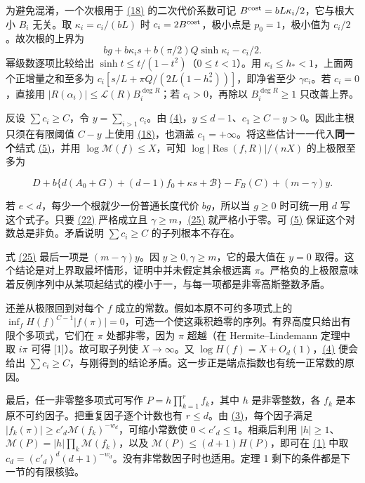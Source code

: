 \documentclass[11pt,a4paper]{article}
\begin{document}
为避免混淆，一个次根用于 \hyperref[eq:18]{(18)} 的二次代价系数可记 \(B^{\rm cost}=bL\kappa_i/2\)，它与根大小 \(B_i\) 无关。取 \(\kappa_i=c_i/(bL)\) 时 \(c_i=2B^{\rm cost}\)，极小点是 \(p_0=1\)，极小值为 \(c_i/2\)。故次根的上界为 \[
 bg+b\kappa_i s+b(\pi/2)Q\sinh\kappa_i-c_i/2 .
\] 幂级数逐项比较给出 \(\sinh t\le t/(1-t^2)\)（\(0\le t<1\)）。用 \(\kappa_i\le h_*<1\)，上面两个正增量之和至多为 \(c_i[s/L+\pi Q/(2L(1-h_*^2))]\)，即净省至少 \(\gamma c_i\)。若 \(c_i=0\)，直接用 \(|R(\alpha_i)|\le\mathcal L(R)B_i^{\deg R}\)；若 \(c_i>0\)，再除以 \(B_i^{\deg R}\ge1\) 只改善上界。

反设 \(\sum c_i\ge C\)，令 \(y=\sum_{i>1}c_i\)。由 \hyperref[eq:4]{(4)}，\(y\le d-1\)、\(c_1\ge C-y>0\)。因此主根只须在有限阈值 \(C-y\) 上使用 \hyperref[eq:18]{(18)}，也涵盖 \(c_1=+\infty\)。将这些估计一一代入\textbf{同一个}结式 \hyperref[eq:5]{(5)}，并用 \(\log\mathcal M(f)\le X\)，可知 \(\log|\operatorname{Res}(f,R)|/(nX)\) 的上极限至多为

\[
 D+b\{d(A_0+G)+(d-1)f_0+\kappa s+\mathcal B\}
       -F_B(C)+(m-\gamma)y .                                              \tag{25}\label{eq:25}
\]

若 \(e<d\)，每少一个根就少一份普通长度代价 \(bg\)，所以当 \(g\ge0\) 时可统一用 \(d\) 写这个式子。只要 \hyperref[eq:22]{(22)} 严格成立且 \(\gamma\ge m\)，\hyperref[eq:25]{(25)} 就严格小于零。可 \hyperref[eq:5]{(5)} 保证这个对数总是非负。矛盾说明 \(\sum c_i\ge C\) 的子列根本不存在。

式 \hyperref[eq:25]{(25)} 最后一项是 \((m-\gamma)y\)。因 \(y\ge0,\gamma\ge m\)，它的最大值在 \(y=0\) 取得。这个结论是对上界取最坏情形，证明中并未假定其余根远离 \(\pi\)。严格负的上极限意味着反例序列中从某项起结式的模小于一，与每一项都是非零高斯整数矛盾。

还差从极限回到对每个 \(f\) 成立的常数。假如本原不可约多项式上的 \(\inf_f H(f)^{C-1}|f(\pi)|=0\)，可选一个使这乘积趋零的序列。有界高度只给出有限个多项式，它们在 \(\pi\) 处都非零，因为 \(\pi\) 超越（在 Hermite--Lindemann 定理中取 \(i\pi\) 可得 {[}1{]}）。故可取子列使 \(X\to\infty\)。又 \(\log H(f)=X+O_d(1)\)，\hyperref[eq:4]{(4)} 便会给出 \(\sum c_i\ge C\)，与刚得到的结论矛盾。这一步正是端点指数也有统一正常数的原因。

最后，任一非零整多项式可写作 \(P=h\prod_{k=1}^r f_k\)，其中 \(h\) 是非零整数，各 \(f_k\) 是本原不可约因子。把重复因子逐个计数也有 \(r\le d\)。由 \hyperref[eq:3]{(3)}，每个因子满足 \(|f_k(\pi)|\ge c'_d\mathcal M(f_k)^{-w_d}\)，可缩小常数使 \(0<c'_d\le1\)。相乘后利用 \(|h|\ge1\)、\(\mathcal M(P)=|h|\prod_k\mathcal M(f_k)\)，以及 \(\mathcal M(P)\le(d+1)H(P)\)，即可在 \hyperref[eq:1]{(1)} 中取 \(c_d=(c'_d)^d(d+1)^{-w_d}\)。没有非常数因子时也适用。定理 1 剩下的条件都是下一节的有限核验。
\end{document}
